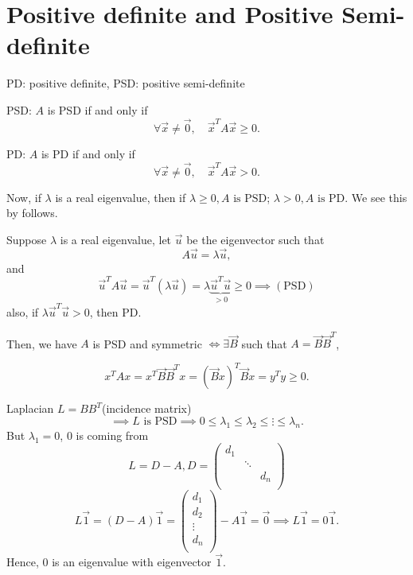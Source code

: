 \section{Positive definite and Positive Semi-definite}
\begin{notation}
	PD: positive definite, PSD: positive semi-definite
\end{notation}

\begin{definition}
	PSD: \(A \) is PSD if and only if
	\[
		\forall \vec{x} \neq  \vec{0},\quad \vec{x}^{T}A \vec{x} \geq  0.
	\]
\end{definition}

\begin{definition}
	PD: \(A \) is PD if and only if
	\[
		\forall \vec{x} \neq  \vec{0},\quad \vec{x}^{T}A \vec{x} > 0.
	\]
\end{definition}

Now, if \(\lambda\) is a real eigenvalue, then if \(\lambda \geq  0, A \text{ is PSD}\); \(\lambda > 0, A \text{ is PD}\). We see this
by follows.

Suppose \(\lambda\) is a real eigenvalue, let \(\vec{u}\) be the eigenvector such that
\[
	A \vec{u} = \lambda \vec{u},
\]
and
\[
	\vec{u}^{T} A \vec{u} = \vec{u}^{T} (\lambda \vec{u}) = \lambda \underbrace{\vec{u}^{T}\vec{u}}_{>0} \geq 0\implies(\text{PSD})
\]
also, if \(\lambda \vec{u}^{T} \vec{u} > 0\), then PD.

Then, we have \(A\) is PSD and symmetric \(\iff \exists \vec{B}\) such that \(A = \vec{B} \vec{B}^{T}\),

\[
	x^{T} A x = x^{T} \vec{B} \vec{B}^{T} x = (\vec{B}x)^{T} \vec{B}x = y^{T} y \geq 0.
\]

Laplacian \(L = B B^{T}\)(incidence matrix)
\[
	\implies L \text{ is PSD}\implies 0 \leq \lambda_1 \leq \lambda_2 \leq \vdots \leq \lambda_n.
\]
But \(\lambda_1 = 0\), \(0\) is coming from
\[
	L = D-A, D = \begin{pmatrix}
		d_1 &        &     \\
		    & \ddots &     \\
		    &        & d_n \\
	\end{pmatrix}
\]
\[
	L \vec{1} = (D - A)\vec{1} = \begin{pmatrix}
		d_1    \\
		d_2    \\
		\vdots \\
		d_n    \\
	\end{pmatrix} - A\vec{1} = \vec{0}\implies L \vec{1} = 0 \vec{1}.
\]
Hence, \(0\) is an eigenvalue with eigenvector \(\vec{1}\).

